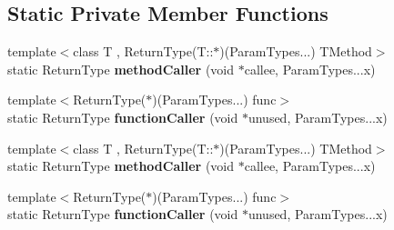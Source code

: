 \subsection*{Static Private Member Functions}
\begin{DoxyCompactItemize}
\item 
{\footnotesize template$<$class T , Return\+Type(\+T\+::$\ast$)(\+Param\+Types...) T\+Method$>$ }\\static Return\+Type {\bfseries method\+Caller} (void $\ast$callee, Param\+Types...\+x)\hypertarget{class_ensum_1_1_utils_1_1_delegate_3_01_return_type_07_param_types_8_8_8_08_4_ab53d0e5bf351106f729586c144cd58bb}{}\label{class_ensum_1_1_utils_1_1_delegate_3_01_return_type_07_param_types_8_8_8_08_4_ab53d0e5bf351106f729586c144cd58bb}

\item 
{\footnotesize template$<$Return\+Type($\ast$)(\+Param\+Types...) func$>$ }\\static Return\+Type {\bfseries function\+Caller} (void $\ast$unused, Param\+Types...\+x)\hypertarget{class_ensum_1_1_utils_1_1_delegate_3_01_return_type_07_param_types_8_8_8_08_4_ad7f1896a49be7b6312d9d4329d1f1622}{}\label{class_ensum_1_1_utils_1_1_delegate_3_01_return_type_07_param_types_8_8_8_08_4_ad7f1896a49be7b6312d9d4329d1f1622}

\item 
{\footnotesize template$<$class T , Return\+Type(\+T\+::$\ast$)(\+Param\+Types...) T\+Method$>$ }\\static Return\+Type {\bfseries method\+Caller} (void $\ast$callee, Param\+Types...\+x)\hypertarget{class_ensum_1_1_utils_1_1_delegate_3_01_return_type_07_param_types_8_8_8_08_4_ab53d0e5bf351106f729586c144cd58bb}{}\label{class_ensum_1_1_utils_1_1_delegate_3_01_return_type_07_param_types_8_8_8_08_4_ab53d0e5bf351106f729586c144cd58bb}

\item 
{\footnotesize template$<$Return\+Type($\ast$)(\+Param\+Types...) func$>$ }\\static Return\+Type {\bfseries function\+Caller} (void $\ast$unused, Param\+Types...\+x)\hypertarget{class_ensum_1_1_utils_1_1_delegate_3_01_return_type_07_param_types_8_8_8_08_4_ad7f1896a49be7b6312d9d4329d1f1622}{}\label{class_ensum_1_1_utils_1_1_delegate_3_01_return_type_07_param_types_8_8_8_08_4_ad7f1896a49be7b6312d9d4329d1f1622}

\end{DoxyCompactItemize}
